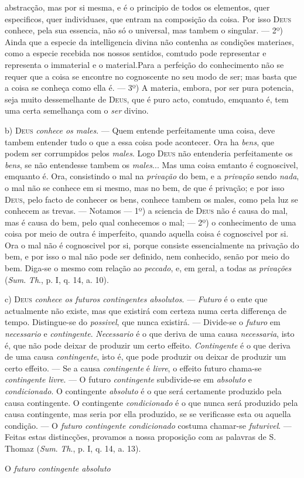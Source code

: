abstracção, mas por si mesma, e é o principio de todos os elementos, quer especificos, quer individuaes, que entram na composição da coisa. Por isso \textsc{Deus} conhece, pela sua essencia, não só o universal, mas tambem o singular. --- 2º) Ainda que a especie da intelligencia divina não contenha as condições materiaes, como a especie recebida nos nossos sentidos, comtudo pode representar e representa o immaterial e o material.Para a perfeição do conhecimento não se requer que a coisa se encontre no cognoscente no seu modo de ser; mas basta que a coisa se conheça como ella é. --- 3º) A materia, embora, por ser pura potencia, seja muito dessemelhante de \textsc{Deus}, que é puro acto, comtudo, emquanto é, tem uma certa semelhança com o \emph{ser} divino.\par b) \textsc{Deus} \emph{conhece os males}. --- Quem entende perfeitamente uma coisa, deve tambem entender tudo o que a essa coisa pode acontecer. Ora ha \emph{bens}, que podem ser corrumpidos pelos \emph{males}. Logo \textsc{Deus} não entenderia perfeitamente os \emph{bens}, se não entendesse tambem os \emph{males}... Mas uma coisa emtanto é cognoscivel, emquanto é. Ora, consistindo o mal na \emph{privação} do bem, e a \emph{privação} sendo \emph{nada}, o mal não se conhece em si mesmo, mas no bem, de que é privação; e por isso \textsc{Deus}, pelo facto de conhecer os bens, conhece tambem os males, como pela luz se conhecem as trevas. --- Notamos --- 1º) a sciencia de \textsc{Deus} não é causa do mal, mas é causa do bem, pelo qual conhecemos o mal; --- 2º) o conhecimento de uma coisa por meio de outra é imperfeito, quando aquella coisa é cognoscivel por si. Ora o mal não é cognoscivel por si, porque consiste essencialmente na privação do bem, e por isso o mal não pode ser definido, nem conhecido, senão por meio do bem. Diga-se o mesmo com relação ao \emph{peccado}, e, em geral, a todas as \emph{privações} (\emph{Sum}. \emph{Th}., p. I, q. 14, a. 10).\par c) \textsc{Deus} \emph{conhece os futuros contingentes absolutos}. --- \emph{Futuro} é o ente que actualmente não existe, mas que existirá com certeza numa certa differença de tempo. Distingue-se do \emph{possivel}, que nunca existirá. --- Divide-se o \emph{futuro} em \emph{necessario} e \emph{contingente}. \emph{Necessario} é o que deriva de uma causa \emph{necessaria}, isto é, que não pode deixar de produzir um certo effeito. \emph{Contingente} é o que deriva de uma causa \emph{contingente}, isto é, que pode produzir ou deixar de produzir um certo effeito. --- Se a causa \emph{contingente} é \emph{livre}, o effeito futuro chama-se \emph{contingente livre}. --- O futuro \emph{contingente} subdivide-se em \emph{absoluto} e \emph{condicionado}. O contingente \emph{absoluto} é o que será certamente produzido pela causa contingente. O contingente \emph{condicionado} é o que nunca será produzido pela causa contingente, mas seria por ella produzido, se se verificasse esta ou aquella condição. --- O \emph{futuro contingente condicionado} costuma chamar-se \emph{futurivel}. --- Feitas estas distincções, provamos a nossa proposição com as palavras de S. Thomaz (\emph{Sum}. \emph{Th}., p. I, q. 14, a. 13).\par O \emph{futuro contingente absoluto} 